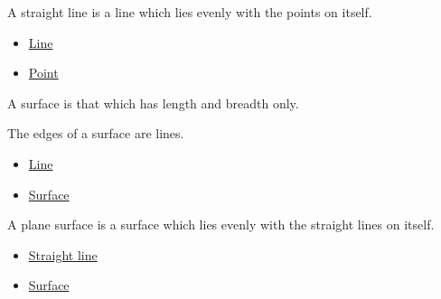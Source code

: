 \begin{definition}
\label{def:euclid-straight-line}
A straight line is a line which lies evenly with the points on itself.
\end{definition}
\begin{lra-not-visible}
\begin{dependencies}
\begin{itemize}
  \item \hyperref[def:euclid-line]{Line}
  \item \hyperref[def:euclid-point]{Point}
\end{itemize}
\end{dependencies}
\end{lra-not-visible}

\begin{definition}[Surface]
\label{def:euclid-surface}
A surface is that which has length and breadth only.
\end{definition}
\begin{lra-not-visible}
\NoLocalDependencies
\end{lra-not-visible}

\begin{definition}
\label{def:euclid-edges-of-a-surface}
The edges of a surface are lines.
\end{definition}
\begin{lra-not-visible}
\begin{dependencies}
\begin{itemize}
  \item \hyperref[def:euclid-line]{Line}
  \item \hyperref[def:euclid-surface]{Surface}
\end{itemize}
\end{dependencies}
\end{lra-not-visible}

\begin{definition}
\label{def:euclid-plane-surface}
A plane surface is a surface which lies evenly with the straight lines on itself.
\end{definition}
\begin{lra-not-visible}
\begin{dependencies}
\begin{itemize}
  \item \hyperref[def:euclid-straight-line]{Straight line}
  \item \hyperref[def:euclid-surface]{Surface}
\end{itemize}
\end{dependencies}
\end{lra-not-visible}

